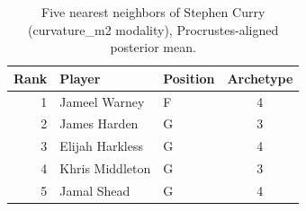 \begin{table}[htbp]
  \centering\small
  \begin{tabular}{rllc}
    \toprule
    Rank & Player & Position & Archetype \\
    \midrule
    1 & Jameel Warney & F & 4 \\
    2 & James Harden & G & 3 \\
    3 & Elijah Harkless & G & 4 \\
    4 & Khris Middleton & G & 3 \\
    5 & Jamal Shead & G & 4 \\
    \bottomrule
  \end{tabular}
  \caption{Five nearest neighbors of Stephen Curry (curvature_m2 modality), Procrustes-aligned posterior mean.}
  \label{tab:Stephen_Curry_neighbors_curvature_m2}
\end{table}

